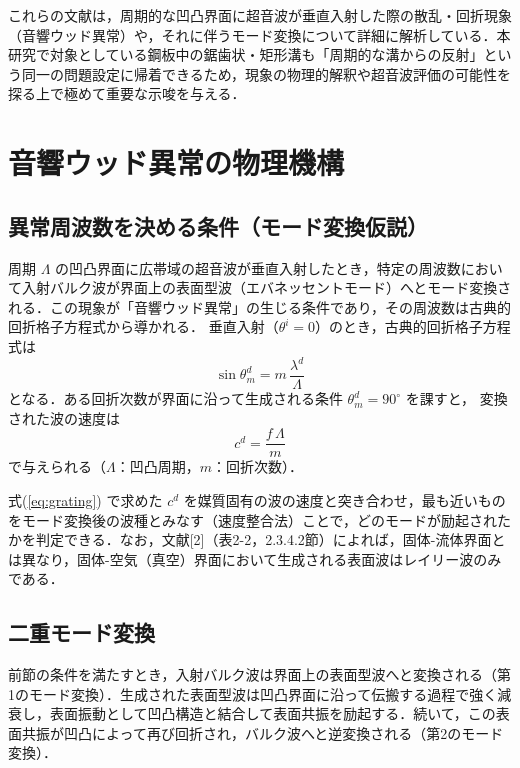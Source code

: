\documentclass{jarticle}
\begin{document}
\par
これらの文献は，周期的な凹凸界面に超音波が垂直入射した際の散乱・回折現象（音響ウッド異常）や，それに伴うモード変換について詳細に解析している．本研究で対象としている鋼板中の鋸歯状・矩形溝も「周期的な溝からの反射」という同一の問題設定に帰着できるため，現象の物理的解釈や超音波評価の可能性を探る上で極めて重要な示唆を与える．


\section{音響ウッド異常の物理機構}

\subsection{異常周波数を決める条件（モード変換仮説）}
\par
周期 $\Lambda$ の凹凸界面に広帯域の超音波が垂直入射したとき，特定の周波数において入射バルク波が界面上の表面型波（エバネッセントモード）へとモード変換される．この現象が「音響ウッド異常」の生じる条件であり，その周波数は古典的回折格子方程式から導かれる．
垂直入射（$\theta^i = 0$）のとき，古典的回折格子方程式は
\begin{equation}
 \sin\theta_m^d = m\,\frac{\lambda^d}{\Lambda}
\end{equation}
となる．ある回折次数が界面に沿って生成される条件 $\theta_m^d = 90^\circ$ を課すと，
変換された波の速度は
\begin{equation}
 c^d = \frac{f\,\Lambda}{m}
 \label{eq:grating}
\end{equation}
で与えられる（$\Lambda$：凹凸周期，$m$：回折次数）．

\par
式(\ref{eq:grating}) で求めた $c^d$ を媒質固有の波の速度と突き合わせ，最も近いものをモード変換後の波種とみなす（速度整合法）ことで，どのモードが励起されたかを判定できる．なお，文献[2]（表2-2，2.3.4.2節）によれば，固体-流体界面とは異なり，固体-空気（真空）界面において生成される表面波はレイリー波のみである．


\subsection{二重モード変換}
\par
前節の条件を満たすとき，入射バルク波は界面上の表面型波へと変換される（第1のモード変換）．生成された表面型波は凹凸界面に沿って伝搬する過程で強く減衰し，表面振動として凹凸構造と結合して表面共振を励起する．続いて，この表面共振が凹凸によって再び回折され，バルク波へと逆変換される（第2のモード変換）．
\end{document}
